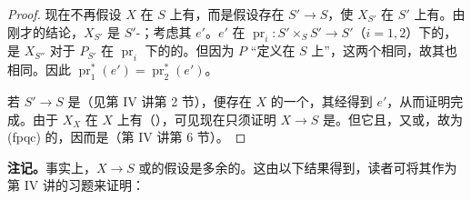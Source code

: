 \begin{proof}
现在不再假设 $X$ 在 $S$ 上有，而是假设存在 $S'\to S$，使 $X_{S'}$ 在 $S'$ 上有。由刚才的结论，$X_{S'}$ 是 $S'$-；考虑其 $e'$。$e'$ 在 $\operatorname{pr}_i:S'\times_S S'\to S'$（$i=1,2$）下的，是 $X_{S''}$ 对于 $P_{S'}$ 在 $\operatorname{pr}_i$ 下的的。但因为 $P$ “定义在 $S$ 上”，这两个相同，故其也相同。因此 $\operatorname{pr}_1^*(e')=\operatorname{pr}_2^*(e')$。

若 $S'\to S$ 是（见第 IV 讲第 2 节），便存在 $X$ 的一个，其经得到 $e'$，从而证明完成。由于 $X_X$ 在 $X$ 上有（），可见现在只须证明 $X\to S$ 是。但它且，又或，故为 (fpqc) 的，因而是（第 IV 讲第 6 节）。
\end{proof}
\textbf{注记。}事实上，$X\to S$ 或的假设是多余的。这由以下结果得到，读者可将其作为第 IV 讲的习题来证明：

